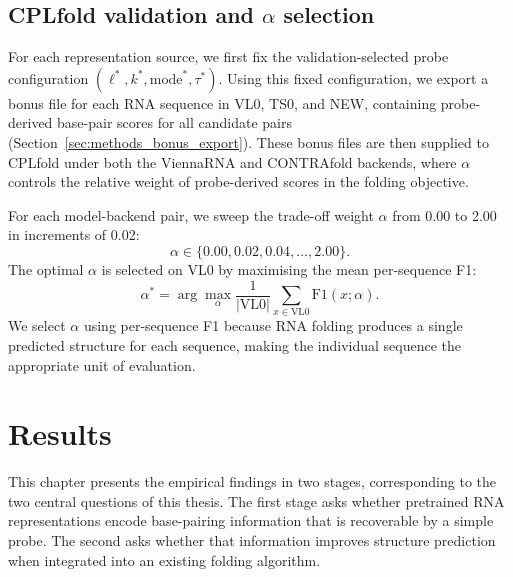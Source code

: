 \documentclass[logo,bsc,singlespacing,parskip]{infthesis}
\begin{document}
\section{CPLfold validation and $\alpha$ selection}
\label{sec:exp_alpha}

For each representation source, we first fix the
validation-selected probe configuration
$(\ell^\ast, k^\ast, \mathrm{mode}^\ast, \tau^\ast)$.
Using this fixed configuration, we export a bonus file for each RNA sequence
in VL0, TS0, and NEW, containing probe-derived base-pair scores
for all candidate pairs (Section~\ref{sec:methods_bonus_export}). These bonus files are then supplied to CPLfold under both the ViennaRNA and CONTRAfold backends, where $\alpha$ controls the relative weight of
probe-derived scores in the folding objective.

For each model-backend pair, we sweep the trade-off weight $\alpha$ from 0.00 to 2.00 in increments of 0.02:
\begin{equation}
\alpha \in \{0.00, 0.02, 0.04, \dots, 2.00\}.
\end{equation}
The optimal $\alpha$ is selected on VL0 by maximising the mean per-sequence F1:
\begin{equation}
\alpha^\ast
=
\arg\max_{\alpha}
\frac{1}{|\mathrm{VL0}|}
\sum_{x \in \mathrm{VL0}} \mathrm{F1}(x;\alpha).
\end{equation}
We select $\alpha$ using per-sequence F1 because RNA folding
produces a single predicted structure for each sequence, making
the individual sequence the appropriate unit of evaluation.

\chapter{Results}
\label{ch:results}
This chapter presents the empirical findings in two stages, corresponding to the two central questions of this thesis. The first stage asks whether pretrained RNA representations encode base-pairing information that is recoverable by a simple probe. The second asks whether that information improves structure prediction when integrated into an existing folding algorithm.
\end{document}

